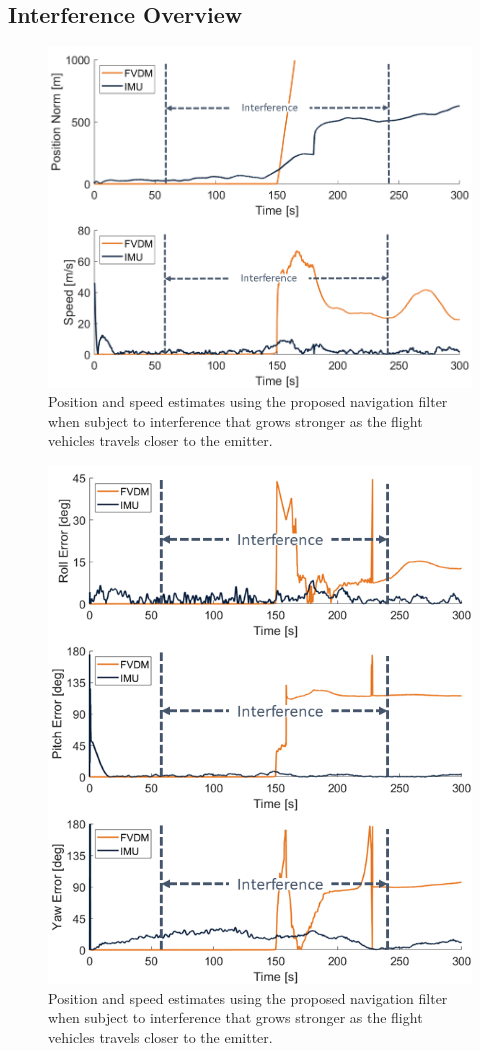 \subsection{\textbf{Interference Overview}}

\begin{figure}[!ht]
    \centering
    \includegraphics[width=0.75\linewidth]{Figures/Results/trajectoryfigure/Slide19.PNG}
    \caption{Position and speed estimates using the proposed navigation filter when subject to interference that grows stronger as the flight vehicles travels closer to the emitter.}\label{fig:PosVelScene2}
\end{figure}


\begin{figure}[!ht]
    \centering
    \includegraphics[width=0.75\linewidth]{Figures/Results/trajectoryfigure/Slide7.PNG}
    \caption{Position and speed estimates using the proposed navigation filter when subject to interference that grows stronger as the flight vehicles travels closer to the emitter.}\label{fig:EulScene2}
\end{figure}


